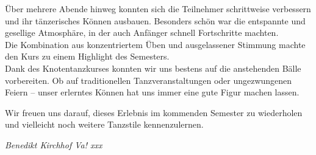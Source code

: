 \begin{multicols}{2}
Über mehrere Abende hinweg konnten sich die Teilnehmer schrittweise verbessern
und ihr tänzerisches Können ausbauen. Besonders schön war die entspannte und
gesellige Atmosphäre, in der auch Anfänger schnell Fortschritte machten.\\
Die Kombination aus konzentriertem Üben und ausgelassener Stimmung machte den
Kurs zu einem Highlight des Semesters.\\
Dank des Knotentanzkurses konnten wir uns bestens auf die anstehenden Bälle
vorbereiten. Ob auf traditionellen Tanzveranstaltungen oder ungezwungenen
Feiern – unser erlerntes Können hat uns immer eine gute Figur machen lassen.

Wir freuen uns darauf, dieses Erlebnis im kommenden Semester zu wiederholen und
vielleicht noch weitere Tanzstile kennenzulernen.

	\begin{flushright}
		\hfill\emph{Benedikt Kirchhof Va! xxx}
	\end{flushright}
\end{multicols}


